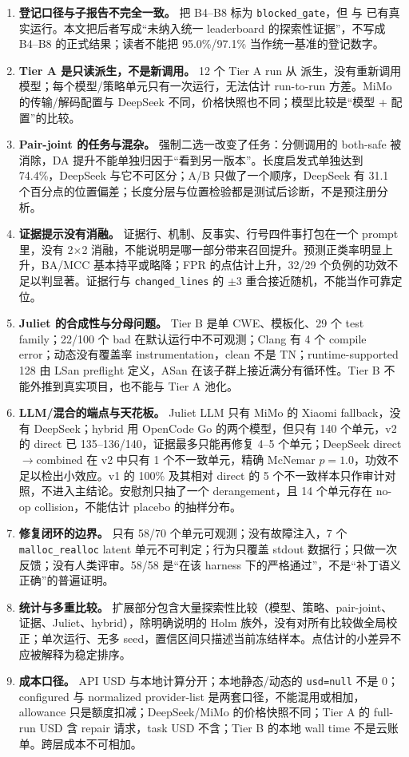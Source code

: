 \documentclass[conference]{IEEEtran}
\begin{document}
\begin{enumerate}
    \item \textbf{登记口径与子报告不完全一致。}  把 B4--B8 标为 \texttt{blocked\_gate}，但  与  已有真实运行。本文把后者写成“未纳入统一 leaderboard 的探索性证据”，不写成 B4--B8 的正式结果；读者不能把 95.0\%/97.1\% 当作统一基准的登记数字。
    \item \textbf{Tier A 是只读派生，不是新调用。} 12 个 Tier A run 从  派生，没有重新调用模型；每个模型/策略单元只有一次运行，无法估计 run-to-run 方差。MiMo 的传输/解码配置与 DeepSeek 不同，价格快照也不同；模型比较是“模型 + 配置”的比较。
    \item \textbf{Pair-joint 的任务与混杂。} 强制二选一改变了任务：分侧调用的 both-safe 被消除，DA 提升不能单独归因于“看到另一版本”。长度启发式单独达到 74.4\%，DeepSeek 与它不可区分；A/B 只做了一个顺序，DeepSeek 有 31.1 个百分点的位置偏差；长度分层与位置检验都是测试后诊断，不是预注册分析。
    \item \textbf{证据提示没有消融。} 证据行、机制、反事实、行号四件事打包在一个 prompt 里，没有 2$\times$2 消融，不能说明是哪一部分带来召回提升。预测正类率明显上升，BA/MCC 基本持平或略降；FPR 的点估计上升，32/29 个负例的功效不足以判显著。证据行与 \texttt{changed\_lines} 的 $\pm3$ 重合接近随机，不能当作可靠定位。
    \item \textbf{Juliet 的合成性与分母问题。} Tier B 是单 CWE、模板化、29 个 test family；22/100 个 bad 在默认运行中不可观测；Clang 有 4 个 compile error；动态没有覆盖率 instrumentation，clean 不是 TN；runtime-supported 128 由 LSan preflight 定义，ASan 在该子群上接近满分有循环性。Tier B 不能外推到真实项目，也不能与 Tier A 池化。
    \item \textbf{LLM/混合的端点与天花板。} Juliet LLM 只有 MiMo 的 Xiaomi fallback，没有 DeepSeek；hybrid 用 OpenCode Go 的两个模型，但只有 140 个单元，v2 的 direct 已 135--136/140，证据最多只能再修复 4--5 个单元；DeepSeek direct$\to$combined 在 v2 中只有 1 个不一致单元，精确 McNemar $p=1.0$，功效不足以检出小效应。v1 的 100\% 及其相对 direct 的 5 个不一致样本只作审计对照，不进入主结论。安慰剂只抽了一个 derangement，且 14 个单元存在 no-op collision，不能估计 placebo 的抽样分布。
    \item \textbf{修复闭环的边界。} 只有 58/70 个单元可观测；没有故障注入，7 个 \texttt{malloc\_realloc} latent 单元不可判定；行为只覆盖 stdout 数据行；只做一次反馈；没有人类评审。58/58 是“在该 harness 下的严格通过”，不是“补丁语义正确”的普遍证明。
    \item \textbf{统计与多重比较。} 扩展部分包含大量探索性比较（模型、策略、pair-joint、证据、Juliet、hybrid），除明确说明的 Holm 族外，没有对所有比较做全局校正；单次运行、无多 seed，置信区间只描述当前冻结样本。点估计的小差异不应被解释为稳定排序。
    \item \textbf{成本口径。} API USD 与本地计算分开；本地静态/动态的 \texttt{usd=null} 不是 0；configured 与 normalized provider-list 是两套口径，不能混用或相加，allowance 只是额度扣减；DeepSeek/MiMo 的价格快照不同；Tier A 的 full-run USD 含 repair 请求，task USD 不含；Tier B 的本地 wall time 不是云账单。跨层成本不可相加。
\end{enumerate}
\end{document}
